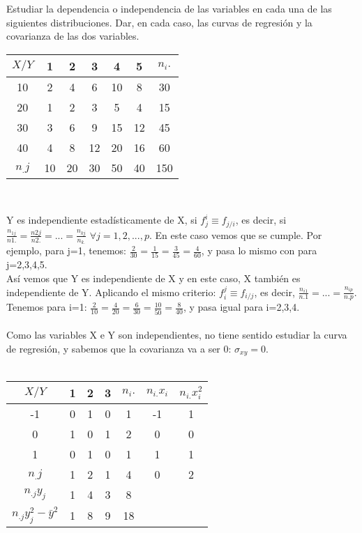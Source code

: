 \problem
Estudiar la dependencia o independencia de las variables en cada una de las siguientes distribuciones. Dar, en cada caso, las curvas de regresión y la covarianza de las dos variables.

    \begin{center}
    \begin{tabular}{| c | c | c | c | c | c | c |}
        \hline
        $X / Y$ & 1 & 2 & 3 & 4 & 5 & $n_i.$\\ \hline
        10 & 2 & 4 & 6 & 10 & 8 & 30 \\ \hline
        20 & 1 & 2 & 3 & 5 & 4 & 15 \\ \hline
        30 & 3 & 6 & 9 & 15 & 12 & 45 \\ \hline
        40 & 4 & 8 & 12 & 20 & 16 & 60 \\ \hline
        $n_.j$ & 10 & 20 & 30 & 50 & 40 & 150 \\       \hline
    \end{tabular} \\ 
    \end{center}
    Y es independiente estadísticamente de X, si $f_j^i \equiv f_{j/i}$, es decir, si $\frac{n_{1j}}{n1.} = \frac{n2j}{n2.} = ... = \frac{n_{kj}}{n_{k.}}$ $ \forall j = 1,2,...,p $. En este caso vemos que se cumple. Por ejemplo, para j=1, tenemos: $\frac{2}{30} = \frac{1}{15} = \frac{3}{45} = \frac{4}{60}$, y pasa lo mismo con para j=2,3,4,5. \\
    Así vemos que Y es independiente de X y en este caso, X también es independiente de Y. Aplicando el mismo criterio: $f_i^j \equiv f_{i/j}$, es decir, $\frac{n_{i1}}{n.1} = ... = \frac{n_{ip}}{n.p}$. Tenemos para i=1: $\frac{2}{10} = \frac{4}{20} = \frac{6}{30} = \frac{10}{50} = \frac{8}{40}$, y pasa igual para i=2,3,4. \\ \\
    Como las variables X e Y son independientes, no tiene sentido estudiar la curva de regresión, y sabemos que la covarianza va a ser 0: $\sigma_{xy} = 0$. \\ \\
    \begin{center}
    \begin{tabular}{| c | c | c | c | c | c | c |}
        \hline
        $X / Y$ & 1 & 2 & 3 & $n_i.$ & $n_{i.}x_i$ & $n_{i.}x_i^2$\\ \hline
        -1 & 0 & 1 & 0 & 1 & -1 & 1 \\ \hline
        0 & 1 & 0 & 1 & 2 & 0 & 0 \\ \hline
        1 & 0 & 1 & 0 & 1 & 1 & 1 \\ \hline
        $n_.j$ & 1 & 2 & 1 & 4 & 0 & 2 \\ \hline
        $n_{.j}y_j$ & 1 & 4 & 3 & 8 & & \\ \hline
        $n_{.j}y_j^2 - \bar{y}^2$ & 1 & 8 & 9 & 18 & & \\
        \hline
    \end{tabular} \\ 
    \end{center}
